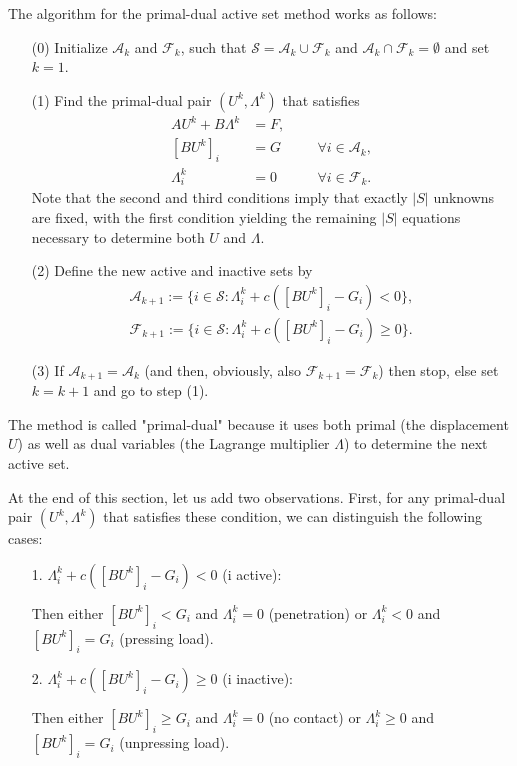 \documentclass{article}
\begin{document}
The algorithm for the primal-dual active set method works as follows:
\begin{itemize}
 \item [(0)] Initialize $\mathcal{A}_k$ and $\mathcal{F}_k$, such that $\mathcal{S}=\mathcal{A}_k\cup\mathcal{F}_k$ and $\mathcal{A}_k\cap\mathcal{F}_k=\emptyset$ and set $k=1$.
 \item [(1)] Find the primal-dual pair $(U^k,\Lambda^k)$ that satisfies
 \begin{align*}
  AU^k + B\Lambda^k &= F,\\
  [BU^k]_i &= G\quad&&\forall i\in\mathcal{A}_k,\\
  \Lambda_i^k &= 0\quad&&\forall i\in\mathcal{F}_k.
 \end{align*}
 Note that the second and third conditions imply that exactly $|S|$ unknowns
 are fixed, with the first condition yielding the remaining $|S|$ equations
 necessary to determine both $U$ and $\Lambda$.
 \item [(2)] Define the new active and inactive sets by
 \begin{equation*}
 \begin{split}
  \mathcal{A}_{k+1}:=\lbrace i\in\mathcal{S}:\Lambda^k_i + c([BU^k]_i - G_i)< 0\rbrace,\\
  \mathcal{F}_{k+1}:=\lbrace i\in\mathcal{S}:\Lambda^k_i + c([BU^k]_i - G_i)\geq 0\rbrace.
 \end{split}
 \end{equation*}
 \item [(3)] If $\mathcal{A}_{k+1}=\mathcal{A}_k$ (and then, obviously, also $\mathcal{F}_{k+1}=\mathcal{F}_k$) then stop, else set $k=k+1$ and go to step (1).
\end{itemize}
The method is called "primal-dual" because it uses both primal (the
displacement $U$) as well as dual variables (the Lagrange multiplier
$\Lambda$) to determine the next active set.

At the end of this section, let us add two observations. First,
for any primal-dual pair $(U^k,\Lambda^k)$ that satisfies these
condition, we can distinguish the following cases:
\begin{itemize}
 \item [1.] $\Lambda^k_i + c([BU^k]_i - G_i) < 0$ (i active):

  Then either $[BU^k]_i<G_i$ and $\Lambda^k_i=0$ (penetration) or $\Lambda^k_i<0$ and $[BU^k]_i=G_i$ (pressing load).
 \item [2.] $\Lambda^k_i + c([BU^k]_i - G_i)\geq 0$ (i inactive):

  Then either $[BU^k]_i\geq G_i$ and $\Lambda^k_i=0$ (no contact) or $\Lambda^k_i\geq0$ and $[BU^k]_i=G_i$ (unpressing load).
\end{itemize}
\end{document}
